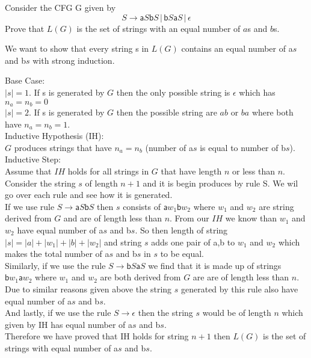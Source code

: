 \documentclass[12pt]{exam}
\begin{document}
\begin{questions}
\begin{solution}
  \end{solution}

  \question{} Consider the CFG G given by
  \[S\to \mathsf{a}S\mathsf{b}S\,|\,\mathsf{b}S\mathsf{a}S\,|\,\epsilon\]
  Prove that $L(G)$ is the set of strings with an equal number of $a$s and $b$s.

  \begin{solution}

    We want to show that every string s in $L(G)$ contains an equal number of a$s$ and b$s$ with strong induction.

    Base Case:\\
    $|s| = 1$. If s is generated by $G$ then the only possible string is $\epsilon$ which has $n_{a}= n_{b}=0$\\
    $|s| = 2$. If s is generated by $G$ then the possible string are $ab$ or $ba$ where both have $n_{a} = n_{b} = 1$.\\
    Inductive Hypothesis (IH):\\
    $G$ produces strings that have $n_{a} = n_{b}$ (number of a$s$ is equal to number of b$s$).\\
    Inductive Step:\\
    Assume that $IH$ holds for all strings in $G$ that have length $n$ or less than $n$. Consider the string $s$ of length $n+1$ and it is begin produces by rule S. We wil go over each rule and see how it is generated.\\
    If we use rule $S\to \mathsf{a}S\mathsf{b}S$ then $s$ consists of $\mathsf{a}w_{1}\mathsf{b}w_{2}$ where $w_{1}$ and $w_{2}$ are string derived from $G$ and are of length less than $n$. From our $IH$ we know than $w_{1}$ and $w_{2}$ have equal number of a$s$ and b$s$. So then length of string $|s| = |a| + |w_{1}| + |b| + |w_{2}|$ and string $s$ adds one pair of a,b to $w_{1}$ and $w_{2}$ which makes the total number of a$s$ and b$s$ in $s$ to be equal.\\
    Similarly, if we use the rule $S\to \mathsf{b}S\mathsf{a}S$ we find that it is made up of strings $\mathsf{b}w_{1}\mathsf{a}w_{2}$ where $w_{1}$ and $w_{2}$ are both derived from $G$ are are of length less than $n$. Due to similar reasons given above the string $s$ generated by this rule also have equal number of a$s$ and b$s$.\\
    And lastly, if we use the rule $S\to \epsilon$ then the string $s$ would be of length $n$ which given by IH has equal number of a$s$ and b$s$.\\
    Therefore we have proved that IH holds for string $n+1$ then $L(G)$ is the set of strings with equal number of a$s$ and b$s$.
  \end{solution}



\end{questions}
\end{document}
